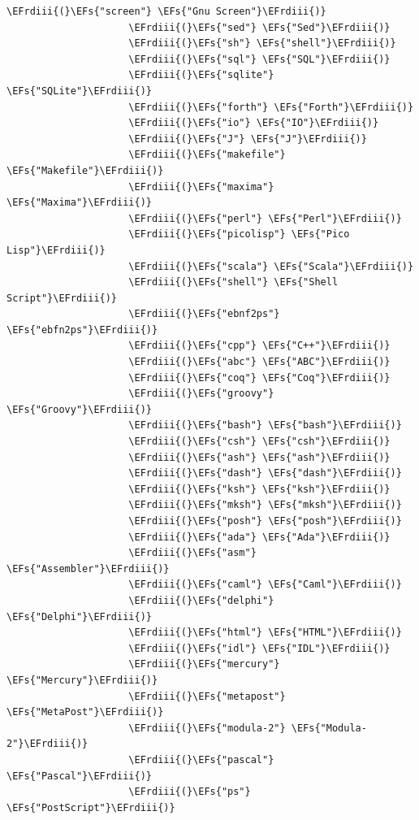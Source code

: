 \documentclass{scrartcl}
\newcommand{\EFs}[1]{\textcolor{EFs}{#1}} %
\newcommand{\EFrdiii}[1]{#1} %
\begin{document}
\begin{Code}
\begin{Verbatim}[]
                     \EFrdiii{(}\EFs{"screen"} \EFs{"Gnu Screen"}\EFrdiii{)}
                     \EFrdiii{(}\EFs{"sed"} \EFs{"Sed"}\EFrdiii{)}
                     \EFrdiii{(}\EFs{"sh"} \EFs{"shell"}\EFrdiii{)}
                     \EFrdiii{(}\EFs{"sql"} \EFs{"SQL"}\EFrdiii{)}
                     \EFrdiii{(}\EFs{"sqlite"} \EFs{"SQLite"}\EFrdiii{)}
                     \EFrdiii{(}\EFs{"forth"} \EFs{"Forth"}\EFrdiii{)}
                     \EFrdiii{(}\EFs{"io"} \EFs{"IO"}\EFrdiii{)}
                     \EFrdiii{(}\EFs{"J"} \EFs{"J"}\EFrdiii{)}
                     \EFrdiii{(}\EFs{"makefile"} \EFs{"Makefile"}\EFrdiii{)}
                     \EFrdiii{(}\EFs{"maxima"} \EFs{"Maxima"}\EFrdiii{)}
                     \EFrdiii{(}\EFs{"perl"} \EFs{"Perl"}\EFrdiii{)}
                     \EFrdiii{(}\EFs{"picolisp"} \EFs{"Pico Lisp"}\EFrdiii{)}
                     \EFrdiii{(}\EFs{"scala"} \EFs{"Scala"}\EFrdiii{)}
                     \EFrdiii{(}\EFs{"shell"} \EFs{"Shell Script"}\EFrdiii{)}
                     \EFrdiii{(}\EFs{"ebnf2ps"} \EFs{"ebfn2ps"}\EFrdiii{)}
                     \EFrdiii{(}\EFs{"cpp"} \EFs{"C++"}\EFrdiii{)}
                     \EFrdiii{(}\EFs{"abc"} \EFs{"ABC"}\EFrdiii{)}
                     \EFrdiii{(}\EFs{"coq"} \EFs{"Coq"}\EFrdiii{)}
                     \EFrdiii{(}\EFs{"groovy"} \EFs{"Groovy"}\EFrdiii{)}
                     \EFrdiii{(}\EFs{"bash"} \EFs{"bash"}\EFrdiii{)}
                     \EFrdiii{(}\EFs{"csh"} \EFs{"csh"}\EFrdiii{)}
                     \EFrdiii{(}\EFs{"ash"} \EFs{"ash"}\EFrdiii{)}
                     \EFrdiii{(}\EFs{"dash"} \EFs{"dash"}\EFrdiii{)}
                     \EFrdiii{(}\EFs{"ksh"} \EFs{"ksh"}\EFrdiii{)}
                     \EFrdiii{(}\EFs{"mksh"} \EFs{"mksh"}\EFrdiii{)}
                     \EFrdiii{(}\EFs{"posh"} \EFs{"posh"}\EFrdiii{)}
                     \EFrdiii{(}\EFs{"ada"} \EFs{"Ada"}\EFrdiii{)}
                     \EFrdiii{(}\EFs{"asm"} \EFs{"Assembler"}\EFrdiii{)}
                     \EFrdiii{(}\EFs{"caml"} \EFs{"Caml"}\EFrdiii{)}
                     \EFrdiii{(}\EFs{"delphi"} \EFs{"Delphi"}\EFrdiii{)}
                     \EFrdiii{(}\EFs{"html"} \EFs{"HTML"}\EFrdiii{)}
                     \EFrdiii{(}\EFs{"idl"} \EFs{"IDL"}\EFrdiii{)}
                     \EFrdiii{(}\EFs{"mercury"} \EFs{"Mercury"}\EFrdiii{)}
                     \EFrdiii{(}\EFs{"metapost"} \EFs{"MetaPost"}\EFrdiii{)}
                     \EFrdiii{(}\EFs{"modula-2"} \EFs{"Modula-2"}\EFrdiii{)}
                     \EFrdiii{(}\EFs{"pascal"} \EFs{"Pascal"}\EFrdiii{)}
                     \EFrdiii{(}\EFs{"ps"} \EFs{"PostScript"}\EFrdiii{)}

\end{Verbatim}
\end{Code}
\end{document}
